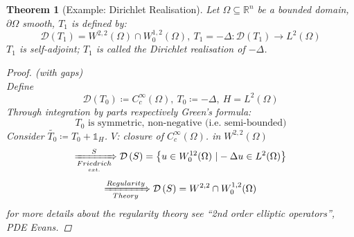 \documentclass[12pt]{extreport} %
\newcommand{\R}{\mathbb{R}}
\newcommand{\DO}[1]{\mathcal{D}\left( {#1} \right)}
\theoremstyle{named}
\theoremstyle{nnamed}
\theoremstyle{itshape}
\newtheorem{theorem}{Theorem}  \counterwithin{theorem}{chapter}
\theoremstyle{normal}
\begin{document}
\begin{theorem}[Example: Dirichlet Realisation]
	Let $\Omega \subseteq \R^n$ be a bounded domain, $\partial \Omega$ smooth, $T_1$ is defined by:
	$$ \DO{T_1} = W^{2,2}(\Omega) \cap W_{0}^{1,2}(\Omega), ~ T_1 = - \Delta \colon \DO{T_1} \rightarrow L^2(\Omega) $$
	$T_1$ is self-adjoint; $T_1$ is called the Dirichlet realisation of $-\Delta$.
	
	\begin{proof}(with gaps) ~\\
		Define 
		$$ \DO{T_0} \coloneqq C_c^\infty(\Omega), ~ T_0 \coloneqq - \Delta, ~ H = L^2(\Omega) $$
		Through integration by parts respectively Green's formula:
		$$ T_0 \text{ is symmetric, non-negative (i.e. semi-bounded)} $$
		Consider $\tilde{T_0} \coloneqq T_0 + \mathds{1}_H$. $V$: closure of $C_c^\infty(\Omega)$. in $W^{2,2}(\Omega)$
		$$ \xRightarrow[\underset{ext.}{Friedrich}]{S} \DO{S} = \big\{ u \in W_0^{12}(\Omega) ~| -\Delta u \in L^2(\Omega) \big\} $$
		$$ \xRightarrow[Theory]{Regularity} \DO{S} = W^{2,2} \cap W_0^{1,2}(\Omega) $$
		for more details about the regularity theory see \enquote{2nd order elliptic operators}, PDE Evans.
	\end{proof}
\end{theorem} \newpage
\end{document}
